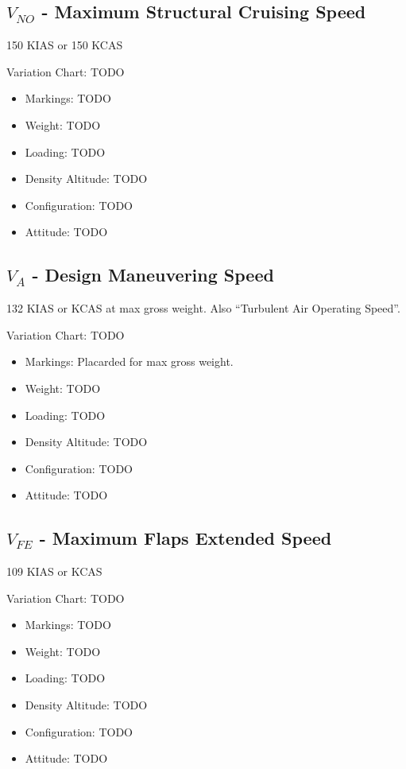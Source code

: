 \subsection{$V_{NO}$ - Maximum Structural Cruising Speed}

150 KIAS or 150 KCAS

Variation Chart: TODO
\begin{itemize}
\item Markings: TODO
\item Weight: TODO
\item Loading: TODO
\item Density Altitude: TODO
\item Configuration: TODO
\item Attitude: TODO
\end{itemize}

\subsection{$V_A$ - Design Maneuvering Speed}

132 KIAS or KCAS at max gross weight. Also ``Turbulent Air Operating Speed''.

Variation Chart: TODO
\begin{itemize}
\item Markings: Placarded for max gross weight.
\item Weight: TODO
\item Loading: TODO
\item Density Altitude: TODO
\item Configuration: TODO
\item Attitude: TODO
\end{itemize}

\subsection{$V_{FE}$ - Maximum Flaps Extended Speed}

109 KIAS or KCAS

Variation Chart: TODO
\begin{itemize}
\item Markings: TODO
\item Weight: TODO
\item Loading: TODO
\item Density Altitude: TODO
\item Configuration: TODO
\item Attitude: TODO
\end{itemize}


